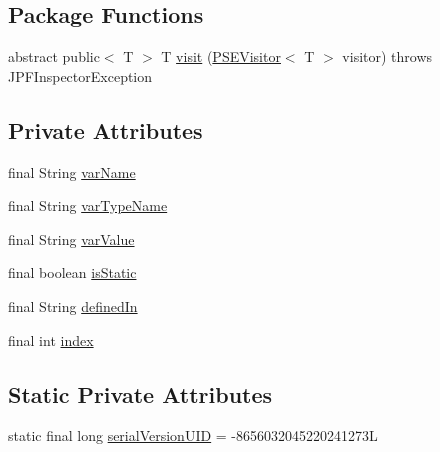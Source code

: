 \subsection*{Package Functions}
\begin{DoxyCompactItemize}
\item 
abstract public$<$ T $>$ T \hyperlink{classgov_1_1nasa_1_1jpf_1_1inspector_1_1common_1_1pse_1_1_program_state_entry_a2a7282da9e128886419b853046f1fd4a}{visit} (\hyperlink{interfacegov_1_1nasa_1_1jpf_1_1inspector_1_1common_1_1pse_1_1_p_s_e_visitor}{P\+S\+E\+Visitor}$<$ T $>$ visitor)  throws J\+P\+F\+Inspector\+Exception
\end{DoxyCompactItemize}
\subsection*{Private Attributes}
\begin{DoxyCompactItemize}
\item 
final String \hyperlink{classgov_1_1nasa_1_1jpf_1_1inspector_1_1common_1_1pse_1_1_p_s_e_variable_ab22ccad7c4981bcadd0ddf2df3337689}{var\+Name}
\item 
final String \hyperlink{classgov_1_1nasa_1_1jpf_1_1inspector_1_1common_1_1pse_1_1_p_s_e_variable_a646062a613747f6813b99f010f361222}{var\+Type\+Name}
\item 
final String \hyperlink{classgov_1_1nasa_1_1jpf_1_1inspector_1_1common_1_1pse_1_1_p_s_e_variable_a898c9a245ba0da48961a76a29c8ee8b3}{var\+Value}
\item 
final boolean \hyperlink{classgov_1_1nasa_1_1jpf_1_1inspector_1_1common_1_1pse_1_1_p_s_e_variable_ad4f7133731afc14a4680c1928e960942}{is\+Static}
\item 
final String \hyperlink{classgov_1_1nasa_1_1jpf_1_1inspector_1_1common_1_1pse_1_1_p_s_e_variable_a2dd10359feb7e7fcf3a6f93c32b76c03}{defined\+In}
\item 
final int \hyperlink{classgov_1_1nasa_1_1jpf_1_1inspector_1_1common_1_1pse_1_1_p_s_e_variable_aa1c82f7362843f3926328cb30c5067cd}{index}
\end{DoxyCompactItemize}
\subsection*{Static Private Attributes}
\begin{DoxyCompactItemize}
\item 
static final long \hyperlink{classgov_1_1nasa_1_1jpf_1_1inspector_1_1common_1_1pse_1_1_p_s_e_variable_ad11aee75ecf196e7e13bf14e3f9287d4}{serial\+Version\+U\+ID} = -\/8656032045220241273L
\end{DoxyCompactItemize}


